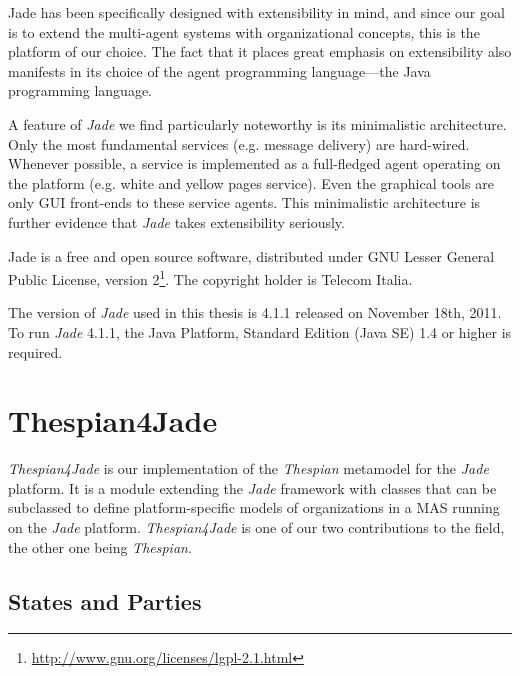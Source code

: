Jade has been specifically designed with extensibility in mind, and since our goal is to extend the multi-agent systems with organizational concepts, this is the platform of our choice.
The fact that it places great emphasis on extensibility also manifests in its choice of the agent programming language---the Java programming language.

A feature of \textit{Jade} we find particularly noteworthy is its minimalistic architecture.
Only the most fundamental services (e.g. message delivery) are hard-wired.
Whenever possible, a service is implemented as a full-fledged agent operating on the platform (e.g. white and yellow pages service).
Even the graphical tools are only GUI front-ends to these service agents.
This minimalistic architecture is further evidence that \textit{Jade} takes extensibility seriously.

Jade is a free and open source software, distributed under GNU Lesser General Public License, version 2\footnote{\url{http://www.gnu.org/licenses/lgpl-2.1.html}}.
The copyright holder is Telecom Italia.

The version of \textit{Jade} used in this thesis is 4.1.1 released on November 18th, 2011.
To run \textit{Jade} 4.1.1, the Java Platform, Standard Edition (Java SE) 1.4 or higher is required.

\section{Thespian4Jade}

\textit{Thespian4Jade} is our implementation of the \textit{Thespian} metamodel for the \textit{Jade} platform.
It is a module extending the \textit{Jade} framework with classes that can be subclassed to define platform-specific models of organizations in a MAS running on the \textit{Jade} platform.
\textit{Thespian4Jade} is one of our two contributions to the field, the other one being \textit{Thespian}.

\subsection{States and Parties}

